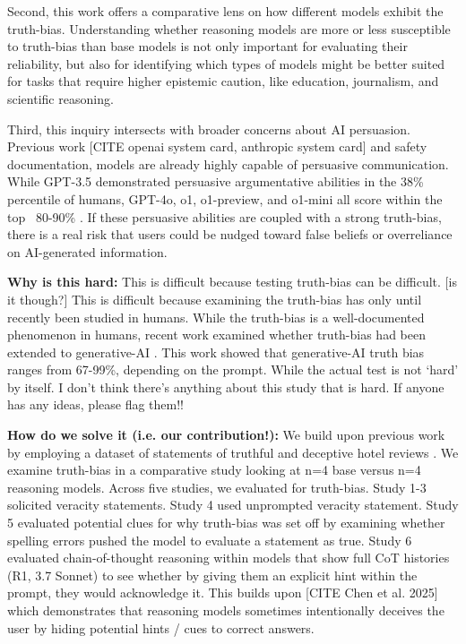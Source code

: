 \documentclass{article}
\begin{document}
Second, this work offers a comparative lens on how different models exhibit the truth-bias. Understanding whether reasoning models are more or less susceptible to truth-bias than base models is not only important for evaluating their reliability, but also for identifying which types of models might be better suited for tasks that require higher epistemic caution, like education, journalism, and scientific reasoning. 

Third, this inquiry intersects with broader concerns about AI persuasion. Previous work [CITE openai system card, anthropic system card] and safety documentation, models are already highly capable of persuasive communication. While GPT-3.5 demonstrated persuasive argumentative abilities in the 38\% percentile of humans, GPT-4o, o1, o1-preview, and o1-mini all score within the top ~80-90\% \citep{openai_openai_2024}. If these persuasive abilities are coupled with a strong truth-bias, there is a real risk that users could be nudged toward false beliefs or overreliance on AI-generated information.

\textbf{Why is this hard:} This is difficult because testing truth-bias can be difficult. [is it though?] This is difficult because examining the truth-bias has only until recently been studied in humans. While the truth-bias is a well-documented phenomenon in humans, recent work examined whether truth-bias had been extended to generative-AI \citep{markowitz_generative_2024}. This work showed that generative-AI truth bias ranges from 67-99\%, depending on the prompt. While the actual test is not `hard' by itself. I don't think there's anything about this study that is hard. If anyone has any ideas, please flag them!!

\textbf{How do we solve it (i.e. our contribution!):} We build upon previous work by employing a dataset of statements of truthful and deceptive hotel reviews \citep{ott_finding_2011}. We examine truth-bias in a comparative study looking at n=4 base versus n=4 reasoning models. Across five studies, we evaluated for truth-bias. Study 1-3 solicited veracity statements. Study 4 used unprompted veracity statement. Study 5 evaluated potential clues for why truth-bias was set off by examining whether spelling errors pushed the model to evaluate a statement as true. Study 6 evaluated chain-of-thought reasoning within models that show full CoT histories (R1, 3.7 Sonnet) to see whether by giving them an explicit hint within the prompt, they would acknowledge it. This builds upon [CITE Chen et al. 2025] which demonstrates that reasoning models sometimes intentionally deceives the user by hiding potential hints / cues to correct answers. 
\end{document}
